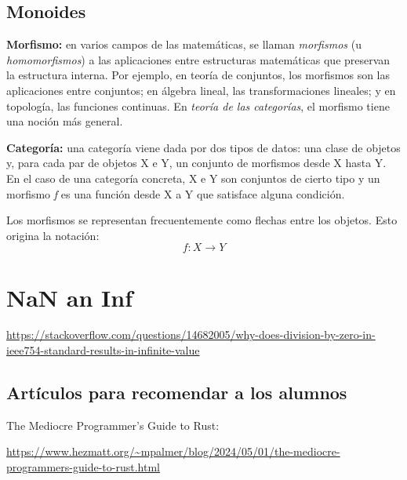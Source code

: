 \section{Monoides}

\textbf{Morfismo:} en varios campos de las matemáticas, se llaman \textit{morfismos} (u \textit{homomorfismos}) a las aplicaciones entre estructuras matemáticas que preservan la estructura interna. Por ejemplo, en teoría de conjuntos, los morfismos son las aplicaciones entre conjuntos; en álgebra lineal, las transformaciones lineales; y en topología, las funciones continuas. En \textit{teoría de las categorías}, el morfismo tiene una noción más general.

\textbf{Categoría:} una categoría viene dada por dos tipos de datos: una clase de objetos y, para cada par de objetos X e Y, un conjunto de morfismos desde X hasta Y. En el caso de una categoría concreta, X e Y son conjuntos de cierto tipo y un morfismo \textit{f} es una función desde X a Y que satisface alguna condición.

Los morfismos se representan frecuentemente como flechas entre los objetos. Esto origina la notación:
\begin{equation}
   f : X \rightarrow Y   
\end{equation}



\chapter{NaN an Inf}

\url{https://stackoverflow.com/questions/14682005/why-does-division-by-zero-in-ieee754-standard-results-in-infinite-value}

\section{Artículos para recomendar a los alumnos}
The Mediocre Programmer's Guide to Rust:

{\footnotesize \url{https://www.hezmatt.org/~mpalmer/blog/2024/05/01/the-mediocre-programmers-guide-to-rust.html} \par}

